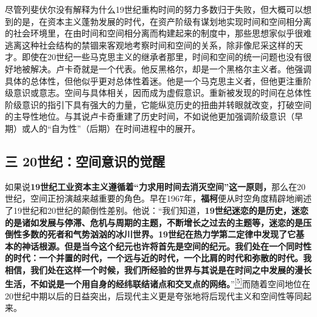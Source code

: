 \documentclass[UTF8, fontset = sourcesans, a4paper, oneside, zihao =
-4, scheme=chinese, no-math, space=true]{ctexbook}
\begin{document}
尽管列斐伏尔没有解释为什么19世纪重构时间的努力多数归于失败，但大概可以想到的是，在资本主义蓬勃发展的时代，在资产阶级有谋划地实现时间和空间相分离的社会环境里，在由时间和空间相分离而构建起来的制度中，那些思想家似乎很难逃离这种社会结构的禁锢来客观地考察时间和空间的关系，除非像尼采这样的天才。即使在20世纪一些马克思主义的继承者那里，时间和空间的统一问题也没有很好地被解决。卢卡奇就是一个代表。他反黑格尔，却是一个黑格尔主义者。他强调具体的总体性，但他似乎更对总体性着迷。他是一个马克思主义者，但他更注重阶级意识或意志。空间与具体相关，因而成为虚假意识。重新被发现的时间在总体性阶级意识的指引下具有强大的力量，它能纵览历史的扭曲并转眼就改变，打破空间的主导性地位。与其说卢卡奇重建了历史时间，不如说他更加强调阶级意识（早期）或人的``自为性''（后期）在时间进程中的展开。

\subsection{三
20世纪：空间意识的觉醒}\label{part0006_split_001.htmlux5cux23c015}

如果说\textbf{19世纪工业资本主义遵循着``力求用时间去消灭空间''这一原则，}那么在20世纪，空间正扮演越来越重要的角色。早在1967年，\textbf{福柯}便从时空角度精辟地阐述了19世纪和20世纪的颠倒性差别。他说：``我们知道，\textbf{19世纪迷恋的是历史，迷恋的是诸如发展与停滞、危机与周期的主题，不断增长之过去的主题等，迷恋的是压倒性多数的死者和气势汹汹的冰川世界。19世纪在热力学第二定律中发现了它基本的神话根源。但是当今这个纪元也许将首先是空间的纪元。我们处在一个同时性的时代：一个并置的时代，一个远与近的时代，一个比肩的时代和弥散的时代。我相信，我们处在这样一个时候，我们所经验的世界与其说是在时间之中发展的漫长生活，不如说是一个用自身的经纬联结诸点和交叉点的网络。}''\protect\hypertarget{part0006_split_001.htmlux5cux23w5}{}{}\protect\hyperlink{part0006_split_003.htmlux5cux23m5}{\textsuperscript{{[}5{]}}}而随着空间地位在20世纪中期以后的日益突出，后现代主义更是夸张地将后现代主义和空间性等同起来。
\end{document}
